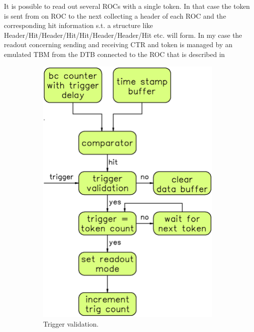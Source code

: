 \documentclass[british,11pt,a4paper]{memoir}
\begin{document}
It is possible to read out several \ac{ROC}s with a single token. In that case the token is sent from on \ac{ROC} to the next collecting a header of each \ac{ROC} and the corresponding hit information s.t. a structure like Header/Hit/Header/Hit/Hit/Header/Header/Hit etc. will form. In my case the readout concerning sending and receiving \ac{CTR} and token is managed by an emulated \ac{TBM} from the \ac{DTB} connected to the \ac{ROC} that is described in 
\begin{figure}[ht]
	\centering
	\begin{subfigure}[b]{0.37\textwidth}
        \includegraphics[width=\textwidth]{trigger}
		\caption{Trigger validation.}
		\label{ptrig}
	\end{subfigure}
	\hfill
	\begin{subfigure}[b]{0.57\textwidth}

\end{subfigure}
\end{figure}
\end{document}

